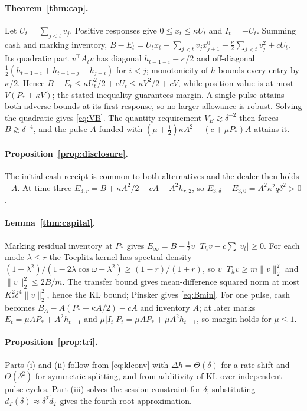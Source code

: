 \paragraph{Theorem~\ref{thm:cap}.} Let $U_t=\sum_{j<t}v_j$. Positive responses give $0\le x_t\le\kappa U_t$ and $I_t=-U_t$. Summing cash and marking inventory, $B-E_t=U_tx_t-\sum_{j<t}v_jx^0_{j+1}-\tfrac\kappa2\sum_{j<t}v_j^2+cU_t$. Its quadratic part $v^\top A_tv$ has diagonal $h_{t-1-i}-\kappa/2$ and off-diagonal $\tfrac12(h_{t-1-i}+h_{t-1-j}-h_{j-i})$ for $i<j$; monotonicity of $h$ bounds every entry by $\kappa/2$. Hence $B-E_t\le\kappa U_t^2/2+cU_t\le\kappa V^2/2+cV$, while position value is at most $V(P_*+\kappa V)$; the stated inequality guarantees margin. A single pulse attains both adverse bounds at its first response, so no larger allowance is robust. Solving the quadratic gives \eqref{eq:VB}. The quantity requirement $V_B\gtrsim\delta^{-2}$ then forces $B\gtrsim\delta^{-4}$, and the pulse $A$ funded with $(\mu+\tfrac12)\kappa A^2+(c+\mu P_*)A$ attains it.

\paragraph{Proposition~\ref{prop:disclosure}.} The initial cash receipt is common to both alternatives and the dealer then holds $-A$. At time three $E_{3,r}=B+\kappa A^2/2-cA-A^2h_{r,2}$, so $E_{3,\delta}-E_{3,0}=A^2\kappa^2q\delta^2>0$.

\paragraph{Lemma~\ref{thm:capital}.} Marking residual inventory at $P_*$ gives $E_\infty=B-\tfrac12v^\top T_hv-c\sum|v_t|\ge0$. For each mode $\lambda\le r$ the Toeplitz kernel has spectral density $(1-\lambda^2)/(1-2\lambda\cos\omega+\lambda^2)\ge(1-r)/(1+r)$, so $v^\top T_hv\ge m\|v\|_2^2$ and $\|v\|_2^2\le2B/m$. The transfer bound gives mean-difference squared norm at most $K_*^2\delta^4\|v\|_2^2$, hence the KL bound; Pinsker gives \eqref{eq:Bmin}. For one pulse, cash becomes $B_A-A(P_*+\kappa A/2)-cA$ and inventory $A$; at later marks $E_t=\mu AP_*+A^2h_{t-1}$ and $\mu|I_t|P_t=\mu AP_*+\mu A^2h_{t-1}$, so margin holds for $\mu\le1$.

\paragraph{Proposition~\ref{prop:tri}.} Parts (i) and (ii) follow from \eqref{eq:klconv} with $\Delta h=\Theta(\delta)$ for a rate shift and $\Theta(\delta^2)$ for symmetric splitting, and from additivity of KL over independent pulse cycles. Part (iii) solves the session constraint for $\delta$; substituting $d_T(\delta)\approx\delta^2\tilde d_T$ gives the fourth-root approximation.

